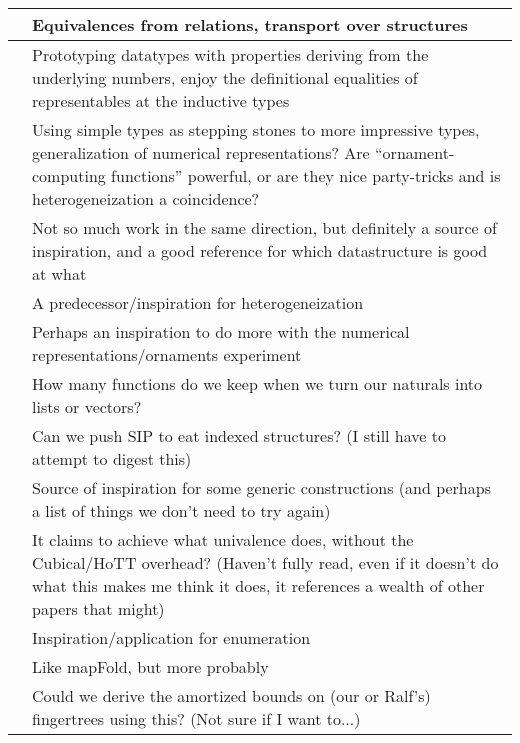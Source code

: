 \documentclass{article}
\theoremstyle{plain}%
\theoremstyle{definition}
\begin{document}
\begin{tabularx}{\textwidth}{l | X}
    \cite{iri}      & Equivalences from relations, transport over structures \\ 
    \hline 
    \cite{calcdata} & Prototyping datatypes with properties deriving from the underlying numbers, enjoy the definitional equalities of representables at the inductive types \\  
    \hline 
    \cite{progorn}  & Using simple types as stepping stones to more impressive types, generalization of numerical representations? Are ``ornament-computing functions'' powerful, or are they nice party-tricks and is heterogeneization a coincidence? \\  
    \hline 
    \cite{purelyfunctional}   & Not so much work in the same direction, but definitely a source of inspiration, and a good reference for which datastructure is good at what \\
    \hline 
    \cite{hetbin}        & A predecessor/inspiration for heterogeneization \\
    \hline 
    \cite{glookup}       & Perhaps an inspiration to do more with the numerical representations/ornaments experiment \\
    \hline 
    \cite{orntrans}      & How many functions do we keep when we turn our naturals into lists or vectors? \\
    \hline 
    \cite{hsip}          & Can we push SIP to eat indexed structures? (I still have to attempt to digest this) \\
    \hline 
    \cite{practgen}      & Source of inspiration for some generic constructions (and perhaps a list of things we don't need to try again) \\
    \hline 
    \cite{tgalois}  & It claims to achieve what univalence does, without the Cubical/HoTT overhead? (Haven't fully read, even if it doesn't do what this makes me think it does, it references a wealth of other papers that might) \\
    \hline 
    \cite{coveringbases} & Inspiration/application for enumeration \\
    \hline 
    \cite{recschemes} & Like mapFold, but more probably \\
    \hline 
    \cite{amortcoind}    & Could we derive the amortized bounds on (our or Ralf's) fingertrees using this? (Not sure if I want to...)
\end{tabularx}
\end{document}
